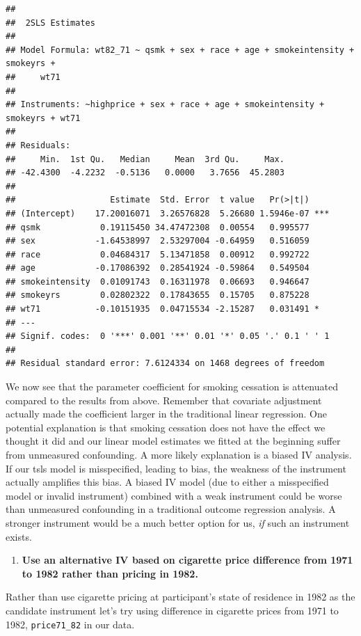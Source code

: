 \documentclass[
]{book}
\providecommand{\tightlist}{%
  \setlength{\itemsep}{0pt}\setlength{\parskip}{0pt}}
\begin{document}
\begin{verbatim}
## 
##  2SLS Estimates
## 
## Model Formula: wt82_71 ~ qsmk + sex + race + age + smokeintensity + smokeyrs + 
##     wt71
## 
## Instruments: ~highprice + sex + race + age + smokeintensity + smokeyrs + wt71
## 
## Residuals:
##     Min.  1st Qu.   Median     Mean  3rd Qu.     Max. 
## -42.4300  -4.2232  -0.5136   0.0000   3.7656  45.2803 
## 
##                   Estimate  Std. Error  t value   Pr(>|t|)    
## (Intercept)    17.20016071  3.26576828  5.26680 1.5946e-07 ***
## qsmk            0.19115450 34.47472308  0.00554   0.995577    
## sex            -1.64538997  2.53297004 -0.64959   0.516059    
## race            0.04684317  5.13471858  0.00912   0.992722    
## age            -0.17086392  0.28541924 -0.59864   0.549504    
## smokeintensity  0.01091743  0.16311978  0.06693   0.946647    
## smokeyrs        0.02802322  0.17843655  0.15705   0.875228    
## wt71           -0.10151935  0.04715534 -2.15287   0.031491 *  
## ---
## Signif. codes:  0 '***' 0.001 '**' 0.01 '*' 0.05 '.' 0.1 ' ' 1
## 
## Residual standard error: 7.6124334 on 1468 degrees of freedom
\end{verbatim}

We now see that the parameter coefficient for smoking cessation is attenuated compared to the results from above. Remember that covariate adjustment actually made the coefficient larger in the traditional linear regression. One potential explanation is that smoking cessation does not have the effect we thought it did and our linear model estimates we fitted at the beginning suffer from unmeasured confounding. A more likely explanation is a biased IV analysis. If our tsls model is misspecified, leading to bias, the weakness of the instrument actually amplifies this bias. A biased IV model (due to either a misspecified model or invalid instrument) combined with a weak instrument could be worse than unmeasured confounding in a traditional outcome regression analysis. A stronger instrument would be a much better option for us, \emph{if} such an instrument exists.

\begin{enumerate}
\def\labelenumi{\arabic{enumi}.}
\setcounter{enumi}{1}
\tightlist
\item
  \textbf{Use an alternative IV based on cigarette price difference from 1971 to 1982 rather than pricing in 1982.}
\end{enumerate}

Rather than use cigarette pricing at participant's state of residence in 1982 as the candidate instrument let's try using difference in cigarette prices from 1971 to 1982, \texttt{price71\_82} in our data.
\end{document}
